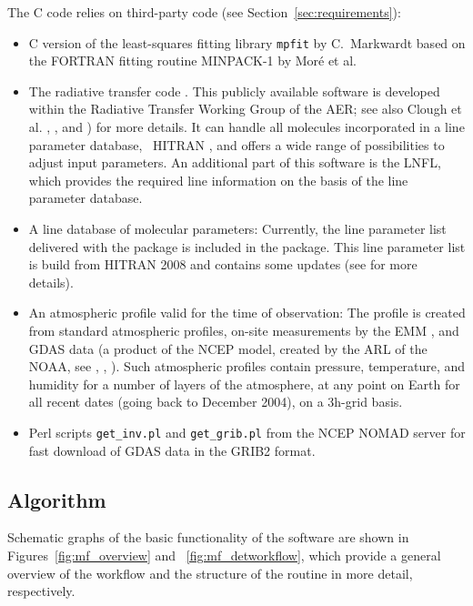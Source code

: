 The C code \mf{} relies on third-party code (see
Section~\ref{sec:requirements}):
\begin{itemize}
    \item C version of the least-squares fitting library {\tt mpfit} by
          C.~Markwardt \cite{CMPFIT} based on the FORTRAN fitting routine
          MINPACK-1 by Mor\'e et al. \cite{MOR80}
    \item The radiative transfer code \lblrtmv. This publicly
          available software is developed within the Radiative Transfer Working
          Group of the \ac{AER}; see also Clough et al. \cite{CLO05},
          \cite{AER}, and \cite{LBLRTM}) for more details. It can handle all
          molecules incorporated in a line parameter database, \eg\ \ac{HITRAN}
          \cite{HITRAN}, and offers a wide range of possibilities to adjust
          input parameters. An additional part of this software is the
          \ac{LNFL}, which provides the required line information on the basis
          of the line parameter database.
    \item A line database of molecular parameters: Currently, the line
          parameter list \aervs{} delivered with the \lblrtmv{}
          package is included in the \mf{} package. This line
          parameter list is build from \ac{HITRAN} 2008 \cite{HITRAN} and
          contains some updates (see \cite{LBLRTM} for more details).
    \item An atmospheric profile valid for the time of observation: The profile
          is created from standard atmospheric profiles, on-site measurements
          by the \ac{EMM} \cite{meteomonitor}, and \ac{GDAS} data (a product of
          the \ac{NCEP} model, created by the \ac{ARL} of the \ac{NOAA}, see
          \cite{AER}, \cite{NOAA}, \cite{GDAS}). Such atmospheric profiles
          contain pressure, temperature, and humidity for a number of layers of
          the atmosphere, at any point on Earth for all recent dates (going
          back to December 2004), on a 3h-grid basis.
    \item Perl scripts {\tt get\_inv.pl} and {\tt get\_grib.pl} from the
          \ac{NCEP} NOMAD server \cite{GRIB} for fast download of \ac{GDAS}
          data in the GRIB2 format.
\end{itemize}

\subsection{Algorithm}\label{sec:algorithm}
Schematic graphs of the basic functionality of the software are shown in
Figures~\ref{fig:mf_overview} and ~\ref{fig:mf_detworkflow}, which provide a
general overview of the workflow and the structure of the \mf{}
routine in more detail, respectively.

